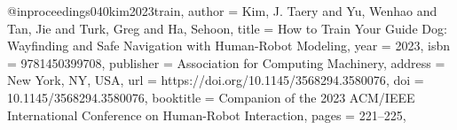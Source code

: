 @inproceedings{040kim2023train,
author = {Kim, J. Taery and Yu, Wenhao and Tan, Jie and Turk, Greg and Ha, Sehoon},
title = {How to Train Your Guide Dog: Wayfinding and Safe Navigation with Human-Robot Modeling},
year = {2023},
isbn = {9781450399708},
publisher = {Association for Computing Machinery},
address = {New York, NY, USA},
url = {https://doi.org/10.1145/3568294.3580076},
doi = {10.1145/3568294.3580076},
booktitle = {Companion of the 2023 ACM/IEEE International Conference on Human-Robot Interaction},
pages = {221–225},
}